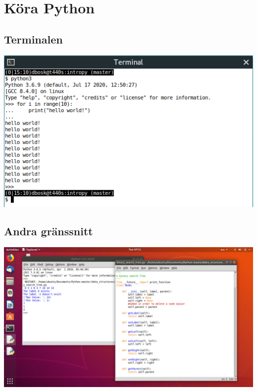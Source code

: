 \section{Köra Python}

\subsection{Terminalen}

\begin{frame}
  \includegraphics[width=\columnwidth]{figs/python-terminal.png}
\end{frame}


\subsection{Andra gränssnitt}

\begin{frame}
  \centering
  \includegraphics[width=\columnwidth]{figs/idle.jpg}
\end{frame}

